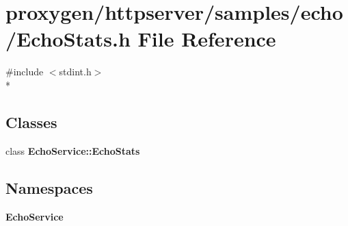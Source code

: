 \section{proxygen/httpserver/samples/echo/\+Echo\+Stats.h File Reference}
\label{EchoStats_8h}
{\ttfamily \#include $<$stdint.\+h$>$}\\*
\subsection*{Classes}
\begin{DoxyCompactItemize}
\item 
class {\bf Echo\+Service\+::\+Echo\+Stats}
\end{DoxyCompactItemize}
\subsection*{Namespaces}
\begin{DoxyCompactItemize}
\item 
 {\bf Echo\+Service}
\end{DoxyCompactItemize}
